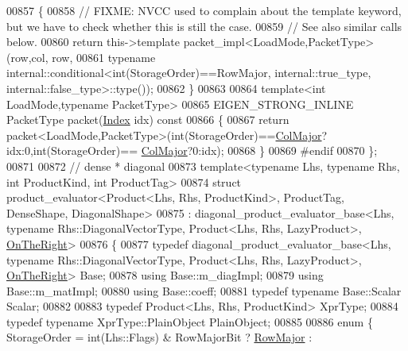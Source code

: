 \begin{DoxyCode}
00857 \textcolor{keyword}{  }\{
00858     \textcolor{comment}{// FIXME: NVCC used to complain about the template keyword, but we have to check whether this is still
       the case.}
00859     \textcolor{comment}{// See also similar calls below.}
00860     \textcolor{keywordflow}{return} this->\textcolor{keyword}{template} packet\_impl<LoadMode,PacketType>(row,col, row,
00861                                  \textcolor{keyword}{typename} internal::conditional<int(StorageOrder)==RowMajor,
       internal::true\_type, internal::false\_type>::type());
00862   \}
00863   
00864   \textcolor{keyword}{template}<\textcolor{keywordtype}{int} LoadMode,\textcolor{keyword}{typename} PacketType>
00865   EIGEN\_STRONG\_INLINE PacketType packet(\hyperlink{namespace_eigen_a62e77e0933482dafde8fe197d9a2cfde}{Index} idx)\textcolor{keyword}{ const}
00866 \textcolor{keyword}{  }\{
00867     \textcolor{keywordflow}{return} packet<LoadMode,PacketType>(int(StorageOrder)==\hyperlink{group__enums_ggaacded1a18ae58b0f554751f6cdf9eb13a0cbd4bdd0abcfc0224c5fcb5e4f6669a}{ColMajor}?idx:0,int(StorageOrder)==
      \hyperlink{group__enums_ggaacded1a18ae58b0f554751f6cdf9eb13a0cbd4bdd0abcfc0224c5fcb5e4f6669a}{ColMajor}?0:idx);
00868   \}
00869 \textcolor{preprocessor}{#endif}
00870 \};
00871 
00872 \textcolor{comment}{// dense * diagonal}
00873 \textcolor{keyword}{template}<\textcolor{keyword}{typename} Lhs, \textcolor{keyword}{typename} Rhs, \textcolor{keywordtype}{int} ProductKind, \textcolor{keywordtype}{int} ProductTag>
00874 \textcolor{keyword}{struct }product\_evaluator<Product<Lhs, Rhs, ProductKind>, ProductTag, DenseShape, DiagonalShape>
00875   : diagonal\_product\_evaluator\_base<Lhs, typename Rhs::DiagonalVectorType, Product<Lhs, Rhs, LazyProduct>, 
      \hyperlink{group__enums_ggac22de43beeac7a78b384f99bed5cee0ba99dc75d8e00b6c3a5bdc31940f47492b}{OnTheRight}>
00876 \{
00877   \textcolor{keyword}{typedef} diagonal\_product\_evaluator\_base<Lhs, typename Rhs::DiagonalVectorType, Product<Lhs, Rhs,
       LazyProduct>, \hyperlink{group__enums_ggac22de43beeac7a78b384f99bed5cee0ba99dc75d8e00b6c3a5bdc31940f47492b}{OnTheRight}> Base;
00878   \textcolor{keyword}{using} Base::m\_diagImpl;
00879   \textcolor{keyword}{using} Base::m\_matImpl;
00880   \textcolor{keyword}{using} Base::coeff;
00881   \textcolor{keyword}{typedef} \textcolor{keyword}{typename} Base::Scalar Scalar;
00882   
00883   \textcolor{keyword}{typedef} Product<Lhs, Rhs, ProductKind> XprType;
00884   \textcolor{keyword}{typedef} \textcolor{keyword}{typename} XprType::PlainObject PlainObject;
00885   
00886   \textcolor{keyword}{enum} \{ StorageOrder = int(Lhs::Flags) & RowMajorBit ? \hyperlink{group__enums_ggaacded1a18ae58b0f554751f6cdf9eb13acfcde9cd8677c5f7caf6bd603666aae3}{RowMajor} : 

\end{DoxyCode}
